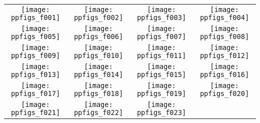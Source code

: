 \documentclass{sig-alternate}
\begin{document}
\begin{figure*}
\centering
\begin{tabular}{@{}c@{}c@{}c@{}c@{}}
\texttt{[image: ppfigs\_f001]}&
\texttt{[image: ppfigs\_f002]}&
\texttt{[image: ppfigs\_f003]}&
\texttt{[image: ppfigs\_f004]}\\
\texttt{[image: ppfigs\_f005]}&
\texttt{[image: ppfigs\_f006]}&
\texttt{[image: ppfigs\_f007]}&
\texttt{[image: ppfigs\_f008]}\\
\texttt{[image: ppfigs\_f009]}&
\texttt{[image: ppfigs\_f010]}&
\texttt{[image: ppfigs\_f011]}&
\texttt{[image: ppfigs\_f012]}\\
\texttt{[image: ppfigs\_f013]}&
\texttt{[image: ppfigs\_f014]}&
\texttt{[image: ppfigs\_f015]}&
\texttt{[image: ppfigs\_f016]}\\
\texttt{[image: ppfigs\_f017]}&
\texttt{[image: ppfigs\_f018]}&
\texttt{[image: ppfigs\_f019]}&
\texttt{[image: ppfigs\_f020]}\\
\texttt{[image: ppfigs\_f021]}&
\texttt{[image: ppfigs\_f022]}&
\texttt{[image: ppfigs\_f023]}&

\end{tabular}
\end{figure*}
\end{document}
